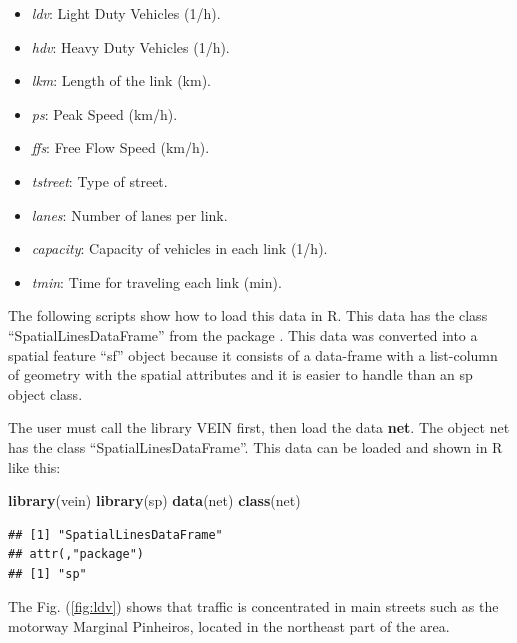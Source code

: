 \documentclass[12pt,graybox,envcountchap,sectrefs]{krantz}
\makeatletter
\newenvironment{Shaded}{\begin{snugshade}}{\end{snugshade}}
\newcommand{\KeywordTok}[1]{\textcolor[rgb]{0.13,0.29,0.53}{\textbf{#1}}}
\newcommand{\DataTypeTok}[1]{\textcolor[rgb]{0.13,0.29,0.53}{#1}}
\newcommand{\DecValTok}[1]{\textcolor[rgb]{0.00,0.00,0.81}{#1}}
\newcommand{\StringTok}[1]{\textcolor[rgb]{0.31,0.60,0.02}{#1}}
\newcommand{\OperatorTok}[1]{\textcolor[rgb]{0.81,0.36,0.00}{\textbf{#1}}}
\newcommand{\NormalTok}[1]{#1}
\providecommand{\tightlist}{%
  \setlength{\itemsep}{0pt}\setlength{\parskip}{0pt}}
\newenvironment{kframe}{%
\medskip{}
\setlength{\fboxsep}{.8em}
 \def\at@end@of@kframe{}%
 \ifinner\ifhmode%
  \def\at@end@of@kframe{\end{minipage}}%
  \begin{minipage}{\columnwidth}%
 \fi\fi%
 \def\FrameCommand##1{\hskip\@totalleftmargin \hskip-\fboxsep
 \colorbox{shadecolor}{##1}\hskip-\fboxsep
     \hskip-\linewidth \hskip-\@totalleftmargin \hskip\columnwidth}%
 \MakeFramed {\advance\hsize-\width
   \@totalleftmargin\z@ \linewidth\hsize
   \@setminipage}}%
 {\par\unskip\endMakeFramed%
 \at@end@of@kframe}
\renewenvironment{Shaded}{\begin{kframe}}{\end{kframe}}
\theoremstyle{definition}
\theoremstyle{definition}
\theoremstyle{definition}
\theoremstyle{remark}
\makeatother
\begin{document}
\begin{itemize}
\tightlist
\item
  \emph{ldv}: Light Duty Vehicles (1/h).
\item
  \emph{hdv}: Heavy Duty Vehicles (1/h).
\item
  \emph{lkm}: Length of the link (km).
\item
  \emph{ps}: Peak Speed (km/h).
\item
  \emph{ffs}: Free Flow Speed (km/h).
\item
  \emph{tstreet}: Type of street.
\item
  \emph{lanes}: Number of lanes per link.
\item
  \emph{capacity}: Capacity of vehicles in each link (1/h).
\item
  \emph{tmin}: Time for traveling each link (min).
\end{itemize}

The following scripts show how to load this data in R. This data has the
class ``SpatialLinesDataFrame'' from the package \citep{sp}. This data
was converted into a spatial feature ``sf'' object \citep{sf} because it
consists of a data-frame with a list-column of geometry with the spatial
attributes and it is easier to handle than an sp object class.

The user must call the library VEIN first, then load the data
\textbf{net}. The object net has the class ``SpatialLinesDataFrame''.
This data can be loaded and shown in R like this:

\begin{Shaded}
\begin{Highlighting}[]
\KeywordTok{library}\NormalTok{(vein)}
\KeywordTok{library}\NormalTok{(sp)}
\KeywordTok{data}\NormalTok{(net)}
\KeywordTok{class}\NormalTok{(net)}
\end{Highlighting}
\end{Shaded}

\begin{verbatim}
## [1] "SpatialLinesDataFrame"
## attr(,"package")
## [1] "sp"
\end{verbatim}

The Fig. (\ref{fig:ldv}) shows that traffic is concentrated in main
streets such as the motorway Marginal Pinheiros, located in the
northeast part of the area.

\begin{Shaded}
\end{Shaded}
\end{document}

